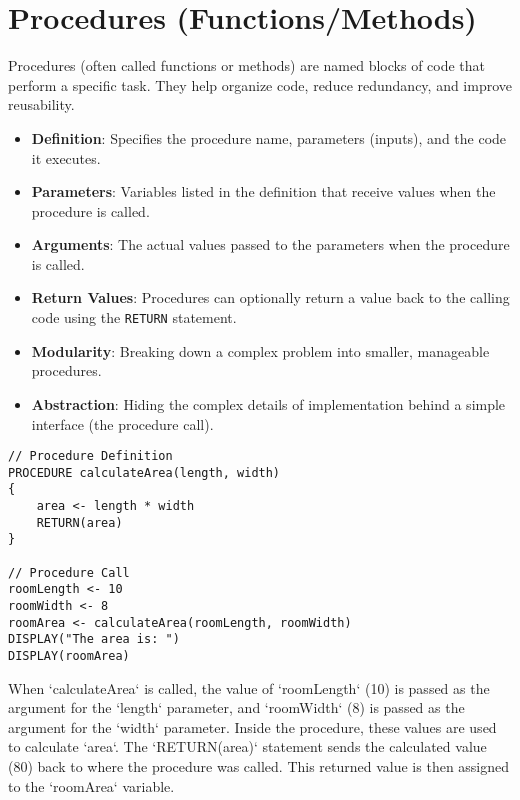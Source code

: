 \documentclass[11pt,oneside]{book}
\begin{document}
\section{Procedures (Functions/Methods)}
\label{sec:procedures}
Procedures (often called functions or methods) are named blocks of code that perform a specific task. They help organize code, reduce redundancy, and improve reusability.
\begin{itemize}
    \item \textbf{Definition}: Specifies the procedure name, parameters (inputs), and the code it executes.
    \item \textbf{Parameters}: Variables listed in the definition that receive values when the procedure is called.
    \item \textbf{Arguments}: The actual values passed to the parameters when the procedure is called.
    \item \textbf{Return Values}: Procedures can optionally return a value back to the calling code using the \texttt{RETURN} statement.
    \item \textbf{Modularity}: Breaking down a complex problem into smaller, manageable procedures.
    \item \textbf{Abstraction}: Hiding the complex details of implementation behind a simple interface (the procedure call).
\end{itemize}
\begin{lstlisting}[language=APCSP, label={lst:procedure}, caption={AP Pseudocode: Procedure Definition and Call}]
// Procedure Definition
PROCEDURE calculateArea(length, width)
{
    area <- length * width
    RETURN(area)
}

// Procedure Call
roomLength <- 10
roomWidth <- 8
roomArea <- calculateArea(roomLength, roomWidth)
DISPLAY("The area is: ")
DISPLAY(roomArea)
\end{lstlisting}
When `calculateArea` is called, the value of `roomLength` (10) is passed as the argument for the `length` parameter, and `roomWidth` (8) is passed as the argument for the `width` parameter. Inside the procedure, these values are used to calculate `area`. The `RETURN(area)` statement sends the calculated value (80) back to where the procedure was called. This returned value is then assigned to the `roomArea` variable.
\end{document}
